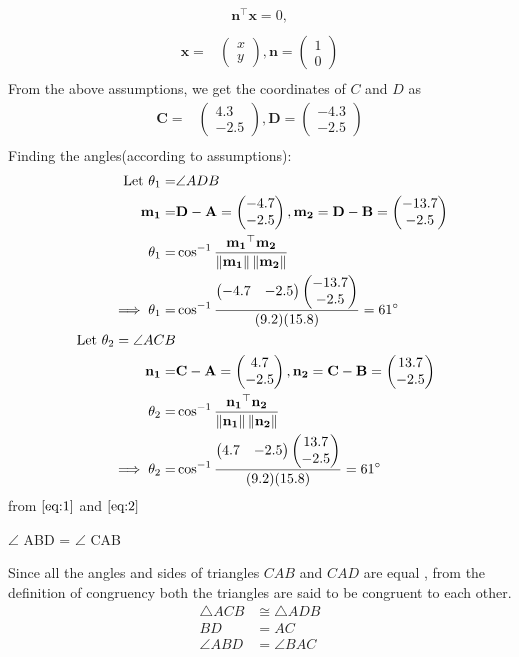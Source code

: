 \documentclass{article}
\providecommand{\norm}[1]{\left\lVert#1\right\rVert}
\newcommand{\myvec}[1]{\ensuremath{\begin{pmatrix}#1\end{pmatrix}}}
\let\vec\mathbf
\begin{document}
\begin{align}
	\vec{n}^{\top}\vec{x} = 0,\\
\end{align}
\begin{align}
\vec{x} =& \myvec{x\\y},\vec{n} = \myvec{1\\0}\\
\end{align}
  From the above assumptions, we get the coordinates of $C$ and $D$ as
  \begin{align}
\vec{C} =& \myvec{4.3\\-2.5},\vec{D} = \myvec{-4.3\\-2.5}\\
  \end{align}
    Finding the angles(according to assumptions):
    \begin{align}
\text{Let }\theta_1=&\angle ADB\\
\vec{m_1}=&\vec{D}-\vec{A}=\myvec{-4.7\\-2.5}, \vec{m_2}=\vec{D}-\vec{B}=\myvec{-13.7\\-2.5}\\
\theta_1=&\cos^{-1}\frac{\vec{m_1}^\top\vec{m_2}}{\norm{\vec{m_1}}\norm{\vec{m_2}}}\\
\implies\theta_1=&\cos^{-1}\frac{\myvec{-4.7&-2.5}\myvec{-13.7\\-2.5}}{(9.2)(15.8)}=61\degree 
\label{eq:1}\\
\text{ Let }\theta_2=\angle ACB\\
\vec{n_1}=&\vec{C}-\vec{A}=\myvec{4.7\\-2.5}, \vec{n_2}=\vec{C}-\vec{B}=\myvec{13.7\\-2.5}\\
\theta_2 =& \cos^{-1}\frac{\vec{n_1}^\top\vec{n_2}}{\norm{\vec{n_1}}\norm{\vec{n_2}}}\\
\implies\theta_2=&\cos^{-1}\frac{\myvec{4.7&-2.5}\myvec{13.7\\-2.5}}{(9.2)(15.8)}=61\degree 
\label{eq:2}
\end{align}
from $\eqref{eq:1}$ and $\eqref{eq:2}$
\begin{center}
$\angle$ ABD = $\angle$ CAB 
\end{center}
Since all the angles and sides of triangles $CAB$ and $CAD$ are equal , from the definition of congruency both the triangles are said to be congruent to each other.
\begin{align}
    \triangle{ACB} & \cong \triangle{ADB}\\
    BD &= AC\\
    \angle{ABD} &= \angle{BAC}
\end{align}
\end{document}
